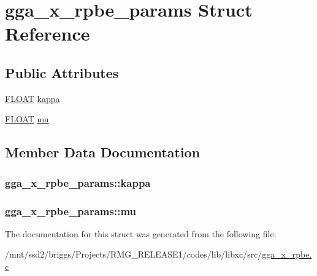 \hypertarget{structgga__x__rpbe__params}{\section{gga\-\_\-x\-\_\-rpbe\-\_\-params Struct Reference}
\label{structgga__x__rpbe__params}
}
\subsection*{Public Attributes}
\begin{DoxyCompactItemize}
\item 
\hyperlink{src_2xc__config_8h_ae8690abbffa85934d64d545920e2b108}{F\-L\-O\-A\-T} \hyperlink{structgga__x__rpbe__params_ae286546f0581e1d22281e90790d9a060}{kappa}
\item 
\hyperlink{src_2xc__config_8h_ae8690abbffa85934d64d545920e2b108}{F\-L\-O\-A\-T} \hyperlink{structgga__x__rpbe__params_a7fdf607ad4a60bee4c6fa938e77acd3d}{mu}
\end{DoxyCompactItemize}


\subsection{Member Data Documentation}
\hypertarget{structgga__x__rpbe__params_ae286546f0581e1d22281e90790d9a060}{
\subsubsection[{kappa}]{ gga\-\_\-x\-\_\-rpbe\-\_\-params\-::kappa}}\label{structgga__x__rpbe__params_ae286546f0581e1d22281e90790d9a060}
\hypertarget{structgga__x__rpbe__params_a7fdf607ad4a60bee4c6fa938e77acd3d}{
\subsubsection[{mu}]{ gga\-\_\-x\-\_\-rpbe\-\_\-params\-::mu}}\label{structgga__x__rpbe__params_a7fdf607ad4a60bee4c6fa938e77acd3d}


The documentation for this struct was generated from the following file\-:\begin{DoxyCompactItemize}
\item 
/mnt/ssd2/briggs/\-Projects/\-R\-M\-G\-\_\-\-R\-E\-L\-E\-A\-S\-E1/codes/lib/libxc/src/\hyperlink{gga__x__rpbe_8c}{gga\-\_\-x\-\_\-rpbe.\-c}\end{DoxyCompactItemize}
